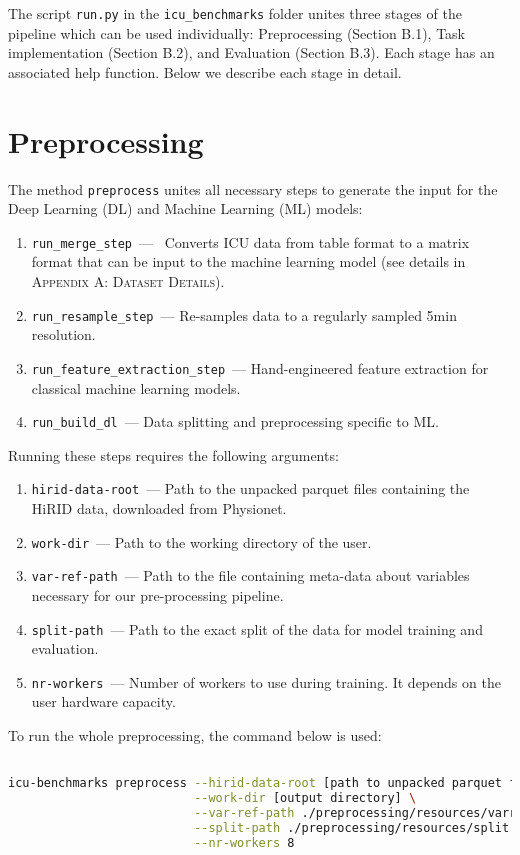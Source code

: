 \documentclass{article}
\begin{document}
The script \texttt{run.py} in the \texttt{icu\_benchmarks} folder unites three stages of the pipeline which can be used individually: Preprocessing (Section B.1), Task implementation (Section B.2), and Evaluation (Section B.3). Each stage has an associated help function. Below we describe each stage in detail.
\section*{Preprocessing}\label{prep_stage}
The method \texttt{preprocess} unites all necessary steps to generate the input for the Deep Learning (DL) and Machine Learning (ML) models:
\begin{enumerate}
    \item  \texttt{run\_merge\_step}~---~ Converts ICU data from table format to a matrix format that can be input to the machine learning model (see details in \textsc{Appendix A: Dataset Details}).
    \item  \texttt{run\_resample\_step}~--- Re-samples data to a regularly sampled 5min resolution.
    \item \texttt{run\_feature\_extraction\_step}~--- Hand-engineered feature extraction for classical machine learning models.
    \item \texttt{run\_build\_dl}~--- Data splitting and preprocessing specific to ML.
\end{enumerate}

Running these steps requires the following arguments: 
\begin{enumerate}
    \item {\texttt{hirid-data-root}}~--- Path to the unpacked parquet files containing the HiRID data, downloaded from Physionet.
    \item {\texttt{work-dir}}~--- Path to the working directory of the user.
    \item {\texttt{var-ref-path}}~--- Path to the file containing meta-data about variables necessary for our pre-processing pipeline.
    \item {\texttt{split-path}}~--- Path to the exact split of the data for model training and evaluation.
    \item {\texttt{nr-workers}}~--- Number of workers to use during training. It depends on the user hardware capacity.
\end{enumerate}

To run the whole preprocessing, the command below is used:
\begin{lstlisting}[language=bash]

icu-benchmarks preprocess --hirid-data-root [path to unpacked parquet files] \
                          --work-dir [output directory] \
                          --var-ref-path ./preprocessing/resources/varref.tsv \
                          --split-path ./preprocessing/resources/split.tsv \
                          --nr-workers 8
\end{lstlisting}
\end{document}
